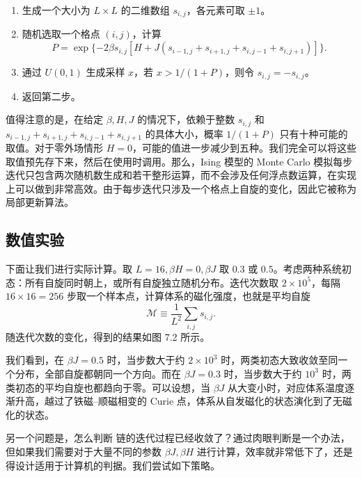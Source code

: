 \begin{algorithmBox}
\begin{enumerate}[label=\arabic*.,leftmargin=2em]
\item 生成一个大小为 $L\times L$ 的二维数组 $s_{i,j}$，各元素可取 $\pm1$。
\item 随机选取一个格点 $(i,j)$，计算
\[
 P=\exp\{-2\beta s_{i,j}[H+J(s_{i-1,j}+s_{i+1,j}+s_{i,j-1}+s_{i,j+1})]\}.
\]
\item 通过 $U(0,1)$ 生成采样 $x$，若 $x>1/(1+P)$，则令 $s_{i,j}=-s_{i,j}$。
\item 返回第二步。
\end{enumerate}
\end{algorithmBox}

值得注意的是，在给定 $\beta,H,J$ 的情况下，依赖于整数 $s_{i,j}$ 和 $s_{i-1,j}+s_{i+1,j}+s_{i,j-1}+s_{i,j+1}$ 的具体大小，概率 $1/(1+P)$ 只有十种可能的取值。对于零外场情形 $H=0$，可能的值进一步减少到五种。我们完全可以将这些取值预先存下来，然后在使用时调用。那么，Ising 模型的 Monte Carlo 模拟每步迭代只包含两次随机数生成和若干整形运算，而不会涉及任何浮点数运算，在实现上可以做到非常高效。由于每步迭代只涉及一个格点上自旋的变化，因此它被称为局部更新算法。

\subsection{数值实验}

下面让我们进行实际计算。取 $L=16,\beta H=0,\beta J$ 取 $0.3$ 或 $0.5$。考虑两种系统初态：所有自旋同时朝上，或所有自旋独立随机分布。迭代次数取 $2\times10^5$，每隔 $16\times16=256$ 步取一个样本点，计算体系的磁化强度，也就是平均自旋
\begin{equation}
 \mathcal M\equiv\frac1{L^2}\sum_{i,j}s_{i,j}.
\tag{7.3.15}
\end{equation}
随迭代次数的变化，得到的结果如图 7.2 所示。

我们看到，在 $\beta J=0.5$ 时，当步数大于约 $2\times10^3$ 时，两类初态大致收敛至同一个分布，全部自旋都朝同一个方向。而在 $\beta J=0.3$ 时，当步数大于约 $10^3$ 时，两类初态的平均自旋也都趋向于零。可以设想，当 $\beta J$ 从大变小时，对应体系温度逐渐升高，越过了铁磁--顺磁相变的 Curie 点，体系从自发磁化的状态演化到了无磁化的状态。

另一个问题是，怎么判断  链的迭代过程已经收敛了？通过肉眼判断是一个办法，但如果我们需要对于大量不同的参数 $\beta J,\beta H$ 进行计算，效率就非常低下了，还是得设计适用于计算机的判据。我们尝试如下策略。

